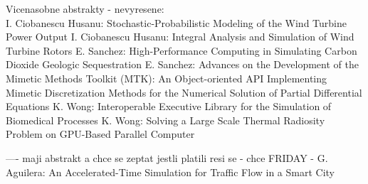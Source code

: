 \documentclass[10pt, A4]{article}%
\begin{document}
Vicenasobne abstrakty - nevyresene:\\
{I. Ciobanescu Husanu}: {Stochastic-Probabilistic Modeling of the Wind Turbine Power Output}
{I. Ciobanescu Husanu}: {Integral Analysis and Simulation of Wind Turbine Rotors}
{E. Sanchez}: {High-Performance Computing in Simulating Carbon Dioxide Geologic Sequestration}
{E. Sanchez}: {Advances on the Development of the Mimetic Methods Toolkit (MTK): An Object-oriented API Implementing Mimetic Discretization Methods for the Numerical Solution of Partial Differential Equations}
{K. Wong}: {Interoperable Executive Library for the Simulation of Biomedical Processes}
{K. Wong}: {Solving a Large Scale Thermal Radiosity Problem on GPU-Based Parallel Computer}




---- maji abstrakt a chce se zeptat jestli platili
resi se - chce FRIDAY - {G. Aguilera}: {An Accelerated-Time Simulation for Traffic Flow in a Smart City}

\end{document}
